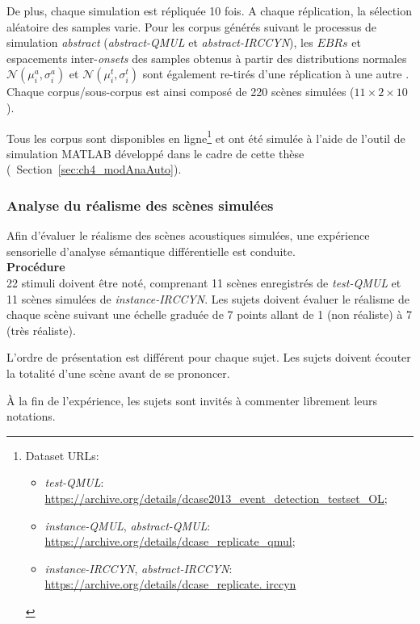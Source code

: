 De plus, chaque simulation est répliquée 10 fois. A chaque réplication, la sélection aléatoire des samples varie. Pour les corpus générés suivant le processus de simulation \emph{abstract} (\emph{abstract-QMUL} et \emph{abstract-IRCCYN}), les $EBRs$ et espacements inter-\emph{onsets} des samples obtenus à partir des distributions normales  $\mathcal{N}(\mu_i^a,\sigma_i^a)$ et $\mathcal{N}(\mu_i^t,\sigma_i^t)$ sont également re-tirés d'une réplication à une autre . Chaque corpus/sous-corpus est ainsi composé de 220 scènes simulées ($11\times2\times10$).

Tous les corpus sont disponibles en ligne\footnote{Dataset URLs: \begin{itemize}
\item \emph{test-QMUL}: \url{https://archive.org/details/dcase2013_event_detection_testset_OL};
\item \emph{instance-QMUL}, \emph{abstract-QMUL}: \url{https://archive.org/details/dcase_replicate_qmul};
\item \emph{instance-IRCCYN}, \emph{abstract-IRCCYN}: \url{https://archive.org/details/dcase_replicate.
irccyn}
\end{itemize}} et ont été simulée à l'aide de l'outil de simulation MATLAB développé dans le cadre de cette thèse (\cf~Section~\ref{sec:ch4_modAnaAuto}).

\subsubsection{Analyse du réalisme des scènes simulées}

Afin d'évaluer le réalisme des scènes acoustiques simulées, une expérience sensorielle d'analyse sémantique différentielle est conduite. \\

\textbf{Procédure} \\

22 stimuli doivent être noté, comprenant 11 scènes enregistrés de \emph{test-QMUL} et 11 scènes simulées de \emph{instance-IRCCYN}. Les sujets doivent évaluer le réalisme de chaque scène suivant une échelle graduée de 7 points allant de 1 (non réaliste) à 7 (très réaliste). 

L'ordre de présentation est différent pour chaque sujet. Les sujets doivent écouter la totalité d'une scène avant de se prononcer.

À la fin de l'expérience, les sujets sont invités à commenter librement leurs notations. \\

